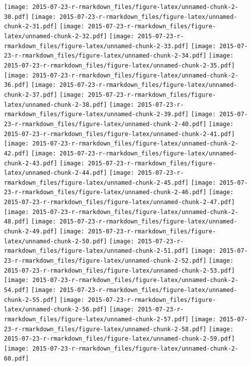 \documentclass[
]{article}
\begin{document}
\texttt{[image: 2015-07-23-r-rmarkdown\_files/figure-latex/unnamed-chunk-2-30.pdf]}
\texttt{[image: 2015-07-23-r-rmarkdown\_files/figure-latex/unnamed-chunk-2-31.pdf]}
\texttt{[image: 2015-07-23-r-rmarkdown\_files/figure-latex/unnamed-chunk-2-32.pdf]}
\texttt{[image: 2015-07-23-r-rmarkdown\_files/figure-latex/unnamed-chunk-2-33.pdf]}
\texttt{[image: 2015-07-23-r-rmarkdown\_files/figure-latex/unnamed-chunk-2-34.pdf]}
\texttt{[image: 2015-07-23-r-rmarkdown\_files/figure-latex/unnamed-chunk-2-35.pdf]}
\texttt{[image: 2015-07-23-r-rmarkdown\_files/figure-latex/unnamed-chunk-2-36.pdf]}
\texttt{[image: 2015-07-23-r-rmarkdown\_files/figure-latex/unnamed-chunk-2-37.pdf]}
\texttt{[image: 2015-07-23-r-rmarkdown\_files/figure-latex/unnamed-chunk-2-38.pdf]}
\texttt{[image: 2015-07-23-r-rmarkdown\_files/figure-latex/unnamed-chunk-2-39.pdf]}
\texttt{[image: 2015-07-23-r-rmarkdown\_files/figure-latex/unnamed-chunk-2-40.pdf]}
\texttt{[image: 2015-07-23-r-rmarkdown\_files/figure-latex/unnamed-chunk-2-41.pdf]}
\texttt{[image: 2015-07-23-r-rmarkdown\_files/figure-latex/unnamed-chunk-2-42.pdf]}
\texttt{[image: 2015-07-23-r-rmarkdown\_files/figure-latex/unnamed-chunk-2-43.pdf]}
\texttt{[image: 2015-07-23-r-rmarkdown\_files/figure-latex/unnamed-chunk-2-44.pdf]}
\texttt{[image: 2015-07-23-r-rmarkdown\_files/figure-latex/unnamed-chunk-2-45.pdf]}
\texttt{[image: 2015-07-23-r-rmarkdown\_files/figure-latex/unnamed-chunk-2-46.pdf]}
\texttt{[image: 2015-07-23-r-rmarkdown\_files/figure-latex/unnamed-chunk-2-47.pdf]}
\texttt{[image: 2015-07-23-r-rmarkdown\_files/figure-latex/unnamed-chunk-2-48.pdf]}
\texttt{[image: 2015-07-23-r-rmarkdown\_files/figure-latex/unnamed-chunk-2-49.pdf]}
\texttt{[image: 2015-07-23-r-rmarkdown\_files/figure-latex/unnamed-chunk-2-50.pdf]}
\texttt{[image: 2015-07-23-r-rmarkdown\_files/figure-latex/unnamed-chunk-2-51.pdf]}
\texttt{[image: 2015-07-23-r-rmarkdown\_files/figure-latex/unnamed-chunk-2-52.pdf]}
\texttt{[image: 2015-07-23-r-rmarkdown\_files/figure-latex/unnamed-chunk-2-53.pdf]}
\texttt{[image: 2015-07-23-r-rmarkdown\_files/figure-latex/unnamed-chunk-2-54.pdf]}
\texttt{[image: 2015-07-23-r-rmarkdown\_files/figure-latex/unnamed-chunk-2-55.pdf]}
\texttt{[image: 2015-07-23-r-rmarkdown\_files/figure-latex/unnamed-chunk-2-56.pdf]}
\texttt{[image: 2015-07-23-r-rmarkdown\_files/figure-latex/unnamed-chunk-2-57.pdf]}
\texttt{[image: 2015-07-23-r-rmarkdown\_files/figure-latex/unnamed-chunk-2-58.pdf]}
\texttt{[image: 2015-07-23-r-rmarkdown\_files/figure-latex/unnamed-chunk-2-59.pdf]}
\texttt{[image: 2015-07-23-r-rmarkdown\_files/figure-latex/unnamed-chunk-2-60.pdf]}
\end{document}

